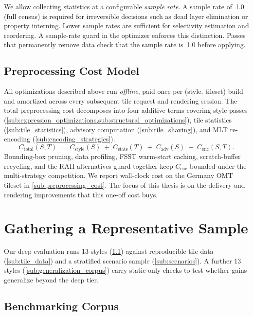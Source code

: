 We allow collecting statistics at a configurable \emph{sample rate}.
A sample rate of~1.0 (full census) is required for irreversible decisions such as dead layer elimination or property interning.
Lower sample rates are sufficient for selectivity estimation and reordering.
A sample-rate guard in the optimizer enforces this distinction.
Passes that permanently remove data check that the sample rate is~1.0 before applying.

\subsection{Preprocessing Cost Model}\label{sub:preprocessing_cost_model}

All optimizations described above run \emph{offline}, paid once per (style, tileset) build and amortized across every subsequent tile request and rendering session.
The total preprocessing cost decomposes into four additive terms covering style passes (\cref{sub:expression_optimizations,sub:structural_optimizations}), tile statistics (\cref{sub:tile_statistics}), advisory computation (\cref{sub:tile_shaving}), and \ac{MLT} re-encoding (\cref{sub:encoding_strategies}).
\begin{equation}\label{eq:cost_model}
    C_\text{total}(S, T) \;=\; C_\text{style}(S) \;+\; C_\text{stats}(T) \;+\; C_\text{adv}(S) \;+\; C_\text{enc}(S, T).
\end{equation}
Bounding-box pruning, data profiling, \ac{FSST} warm-start caching, scratch-buffer recycling, and the \ac{RAII} alternatives guard together keep $C_\text{enc}$ bounded under the multi-strategy competition.
We report wall-clock cost on the Germany \ac{OMT} tileset in \cref{sub:preprocessing_cost}.
The focus of this thesis is on the delivery and rendering improvements that this one-off cost buys.

\section{Gathering a Representative Sample}\label{sec:gathering_sample}

Our deep evaluation runs 13 styles (\cref{sub:deep_corpus}) against reproducible tile data (\cref{sub:tile_data}) and a stratified scenario sample (\cref{sub:scenarios}).
A further 13 styles (\cref{sub:generalization_corpus}) carry static-only checks to test whether gains generalize beyond the deep tier.

\subsection{Benchmarking Corpus}\label{sub:deep_corpus}

